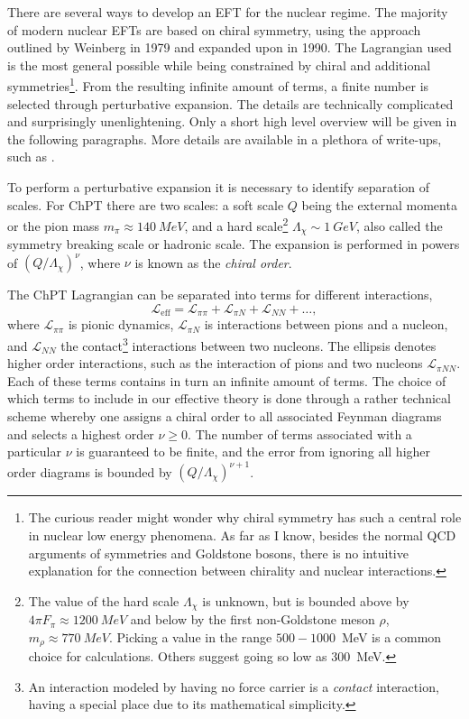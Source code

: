 There are several ways to develop an EFT for the nuclear regime. The majority of
modern nuclear EFTs are based on chiral symmetry, using the approach outlined by Weinberg in
1979 and expanded upon in 1990\cite{WEINBERG19913}. The Lagrangian used is the most general possible while being
constrained by chiral and additional symmetries\footnote{The
  curious reader might wonder why chiral symmetry has such a central role in
  nuclear low energy phenomena. As far as I know, besides the normal QCD arguments of symmetries and
  Goldstone bosons, there is no intuitive explanation for the connection between
  chirality and nuclear interactions.}. From the resulting infinite
amount of terms, a finite number is selected through perturbative expansion. The
details are technically complicated and surprisingly unenlightening. Only a short high level overview will be
given in the following paragraphs. More details are available in a plethora of
write-ups, such as \cite{EPELBAUM2012343,MACHLEIDT20111,lepage1997renormalize}.


To perform a perturbative expansion it is necessary to identify separation of
scales. For ChPT there are two scales: a soft scale \(Q\) being the external
momenta or the pion mass \mbox{\(m_{\pi} \approx \SI{140}{MeV}\)}, and a hard
scale\footnote{The value of the hard scale \(\Lambda_{\chi}\) is unknown, but is
bounded above by \mbox{\(4\pi F_{\pi}\approx \SI{1200}{MeV}\)}\cite[p.~18]{EPELBAUM2012343} and below by the first
non-Goldstone meson \(\rho\), \(m_{\rho}\approx \SI{770}{MeV}\). Picking a value
in the range \mbox{\(500-1000\) MeV} is a common choice for
calculations\cite[p.~29]{lepage1997renormalize}.
Others suggest going so low as \SI{300}{MeV}\cite[p.~64,p.~36]{dickhoff2008many,lepage1997renormalize}.}
\(\Lambda_{\chi}\sim \SI{1}{GeV}\), also called the symmetry breaking scale or
hadronic scale. The expansion is performed in powers of \(\left(
  Q/\Lambda_{\chi} \right)^{\nu}\), where \(\nu\) is known as the \textit{chiral
order}.

The ChPT Lagrangian can be separated into terms for different interactions,
\begin{equation*}
  \label{eq:1}
  \mathcal{L}_{\text{eff}} = \mathcal{L}_{\pi\pi} + \mathcal{L}_{\pi N} + \mathcal{L}_{NN}+\ldots ,
\end{equation*}
where \(\mathcal{L}_{\pi\pi}\) is pionic dynamics, \(\mathcal{L}_{\pi N}\)
is interactions between pions and a nucleon, and \(\mathcal{L}_{NN}\) the
contact\footnote{An interaction modeled by having no force carrier is a
  \textit{contact} interaction, having a special place due to its mathematical simplicity.} interactions between two nucleons. The ellipsis denotes higher order
interactions, such as the interaction of pions and two nucleons
\(\mathcal{L}_{\pi NN}\). Each of these terms
contains in turn an infinite amount of terms. 
The choice of which terms to include in our effective theory is done through a
rather technical scheme whereby one assigns a chiral order to all associated
Feynman diagrams and selects a highest order \(\nu\geq 0\). The number of terms
associated with a particular \(\nu\) is guaranteed to be finite, and the error
from ignoring all higher order diagrams is bounded by \(\left(
  Q/\Lambda_{\chi} \right)^{\nu+1}\). 


